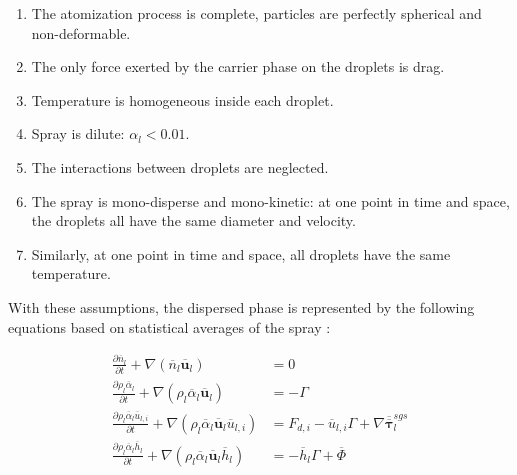 \begin{enumerate}

\item The atomization process is complete, particles are perfectly spherical and non-deformable.

\item The only force exerted by the carrier phase on the droplets is drag.

\item Temperature is homogeneous inside each droplet.

\item Spray is dilute: $\alpha_l < 0.01$.

\item The interactions between droplets are neglected.

\item The spray is mono-disperse and mono-kinetic: at one point in time and space, the droplets all have the same diameter and velocity.

\item Similarly, at one point in time and space, all droplets have the same temperature.


\end{enumerate}

With these assumptions, the dispersed phase is represented by the following equations based on statistical averages of the spray :

\begin{subequations}
\label{eq:EE_disperse_phase}
\begin{align}
\frac{\partial \overline{n}_l}{\partial t} + \nabla \left( \overline{n}_l \overline{\textbf{u}}_l \right)  &= 0 \\
\frac{\partial \rho_l \overline{\alpha}_l}{\partial t} + \nabla \left( \rho_l \overline{\alpha}_l \overline{\textbf{u}}_l \right) &= - \Gamma \\
\frac{\partial \rho_l \overline{\alpha}_l \overline{u}_{l,i}}{\partial t} + \nabla \left( \rho_l \overline{\alpha}_l \overline{\textbf{u}}_l \overline{u}_{l,i} \right) &= F_{d,i} - \overline{u}_{l,i} \Gamma  + \nabla \overline{\overline{\pmb{\tau}}}_l^{sgs} \\
\frac{\partial \rho_l \overline{\alpha}_l \overline{h}_l}{\partial t} + \nabla \left( \rho_l \overline{\alpha}_l \overline{\textbf{u}}_l  \overline{h}_l \right) &=  - \overline{h}_l  \Gamma + \overline{\Phi}
\end{align}
\end{subequations}

